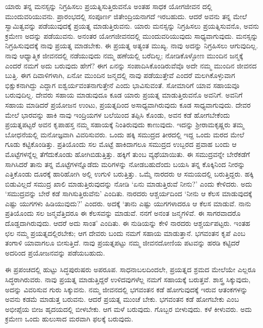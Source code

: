 ಯಾರು ತನ್ನ ಮನಸ್ಸನ್ನು ನಿಗ್ರಹಿಸಲು ಪ್ರಯತ್ನಿಸುತ್ತಿರುವನೊ ಅಂತಹ ಸಾಧಕ ಯೋಗಜೀವನ ದಲ್ಲಿ ಮುಂದುವರಿಯುವನು. ಪ್ರಾರಂಭದಲ್ಲಿ ಸಂಪೂರ್ಣ ಜಿತೇಂದ್ರಿಯನಾಗದೆ ಇರಬಹುದು. ಆದರೆ ಅವನು ತನ್ನ ಮೇಲೆ ಸ್ವಾಮಿತ್ವವನ್ನು ಪಡೆಯುವುದಕ್ಕೆ ಪ್ರಯತ್ನ ಮಾಡುತ್ತಿರುವನು. ಯಾರು ಮನಸ್ಸನ್ನು ನಿಗ್ರಹಿಸಲು ಪ್ರಯತ್ನಿಸುವನೊ, ಅವನು ಕ್ರಮೇಣ ಅದನ್ನು ಪಡೆಯುವನು. ಅನಂತರ ಯೋಗಜೀವನದಲ್ಲಿ ಮುಂದುವರಿಯುವುದು ಸಾಧ್ಯವಾಗುವುದು. ಮನಸ್ಸನ್ನು ನಿಗ್ರಹಿಸುವುದಕ್ಕೆ ನಾವು ಪ್ರಯತ್ನ ಮಾಡಬೇಕು. ಈ ಪ್ರಯತ್ನ ಅತ್ಯಂತ ಮುಖ್ಯ. ನಾವು ಅದನ್ನು ನಿಗ್ರಹಿಸಲು ಆಗುವುದಿಲ್ಲ. ನಾವು ಆಧ್ಯಾತ್ಮಿಕ ಜೀವನದಲ್ಲಿ ನಡೆಯುವುದು ನಮ್ಮ ಹಣೆಯಲ್ಲಿ ಬರೆದಿಲ್ಲ; ನೋಡಿಕೊಳ್ಳೋಣ ಮುಂದಿನ ಜನ್ಮಕ್ಕೆ ಎಂದರೆ ನಮಗೆ ಅದು ಬರುವುದು ಹೇಗೆ? ಈಗ ಏನನ್ನು ಸಂಪಾದಿಸಿಕೊಂಡಿರುವೆವೊ ಅದೇ ನಮ್ಮ ಮುಂದಿನ ಜೀವನದ ಬುತ್ತಿ. ಈಗ ದಿವಾಳಿಗಳಾಗಿ, ಏನೋ ಮುಂದಿನ ಜನ್ಮದಲ್ಲಿ ನಾವು ಪಡೆಯುತ್ತೇವೆ ಎಂದರೆ ಮಲಗಿಕೊಳ್ಳುವಾಗ ಭಿಕ್ಷುಕನಾಗಿದ್ದು ಎದ್ದಾಗ ಐಶ್ವರ್ಯವಂತನಾಗುತ್ತೇನೆ ಎಂದು ಭಾವಿಸುವಂತೆ. ಸೋಮಾರಿಗೆ ಯಾವ ಸಹಾಯವೂ ಬರುವುದಿಲ್ಲ. ದೇವರು ಸಹಾಯ ಮಾಡುವುದೂ ಕೂಡ ಯಾರು ಪ್ರಯತ್ನ ಮಾಡುತ್ತಿರುವನೊ ಅವನಿಗೆ. ಅವನಿಗೆ ಸಹಾಯ ಮಾಡಿದರೆ ಪ್ರಯೋಜನ ಉಂಟು, ಪ್ರಯತ್ನದಿಂದ ಅಸಾಧ್ಯವಾಗಿರುವುದು ಕೂಡ ಸಾಧ್ಯವಾಗುವುದು. ದೇವರ ಮೇಲೆ ಭಾರವನ್ನು ಹಾಕಿ ನಾವು ಇಂದ್ರಿಯಗಳ ಬಲೆಯಿಂದ ತಪ್ಪಿಸಿ ಕೊಂಡು, ಅವನ ಕಡೆ ಹೋಗಬೇಕೆಂದು ಪ್ರಯತ್ನಪಟ್ಟರೆ ಅವನ ಕೃಪಾಹಸ್ತ ನಮ್ಮ ಸಹಾಯಕ್ಕೆ ನಿಂತಿರುವುದು ಕಾಣುವುದು. ಇದನ್ನು ಶ‍್ರೀರಾಮಕೃಷ್ಣರು ತಮ್ಮ ಬೋಧನೆಯಲ್ಲಿ ಮನೋಜ್ಞವಾಗಿ ವಿವರಿಸುವರು. ಒಂದು ಹಕ್ಕಿ ಸಮುದ್ರದ ತೀರದಲ್ಲಿ ಇದ್ದ ಒಂದು ಮರದ ಮೇಲೆ ಗೂಡು ಕಟ್ಟಿಕೊಂಡಿತ್ತು. ಪ್ರತಿಯೊಂದು ಸಲ ಮೊಟ್ಟೆ ಹಾಕಿದಾಗಲೂ ಸಮುದ್ರದ ಉಬ್ಬರದ ಪ್ರವಾಹ ಬಂದು ಆ ಮೊಟ್ಟೆಗಳನ್ನೆಲ್ಲ ತೆಗೆದುಕೊಂಡು ಹೋಗಿಬಿಡುತ್ತಿತ್ತು. ಹಕ್ಕಿಗೆ ತುಂಬ ವ್ಯಥೆಯಾಯಿತು. ಈ ಸಮುದ್ರವನ್ನೇ ಬೇರೆಕಡೆಗೆ ಸಾಗಿಸಿದರೆ ತಾನು ತನ್ನ ಮೊಟ್ಟೆಗಳನ್ನೊಡೆದು ಮರಿಗಳನ್ನು ನೋಡಬಹುದೆಂದು ಬಯಸಿ ತನ್ನ ಕೊಕ್ಕಿನಿಂದ ನೀರನ್ನು ಎತ್ತಿಕೊಂಡು ದೂರಕ್ಕೆ ಹಾರಿಹೋಗಿ ಅಲ್ಲಿ ಉಗುಳಿ ಬರುತ್ತಿತ್ತು. ಒಮ್ಮೆ ನಾರದರು ಆ ಸಮಯದಲ್ಲಿ ಬರುತ್ತಿದ್ದರು. ಹಕ್ಕಿ ಬಿಡುವಿಲ್ಲದೆ ಸಮುದ್ರ ಖಾಲಿ ಮಾಡುತ್ತಿರುವುದನ್ನು ನೋಡಿ ‘ಏನು ಮಾಡುತ್ತಿರುವೆ ನೀನು?’ ಎಂದು ಕೇಳಿದರು. ಅದು ‘ಸಮುದ್ರವನ್ನು ಬೇರೆ ಕಡೆ ಸಾಗಿಸುತ್ತಿರುವೆನು’ ಎಂದಿತು. ನಾರದರು ಆಶ್ಚರ್ಯದಿಂದ ‘ನೀನು ಆ ಕೆಲಸ ಮಾಡುವುದಕ್ಕೆ ಎಷ್ಟು ಯುಗಗಳು ಹಿಡಿಯುವುದು?’ ಎಂದರು. ಅದಕ್ಕೆ ‘ತಾನು ಎಷ್ಟು ಯುಗಗಳಾದರೂ ಆ ಕೆಲಸ ಮಾಡುವೆ. ನಾನು ಪ್ರತಿಯೊಂದು ಸಲ ಜನ್ಮವೆತ್ತಿದರೂ ಈ ಕೆಲಸವನ್ನು ಮಾಡುವೆ. ನನಗೆ ಅನಂತ ಜನ್ಮಗಳಿವೆ. ಈ ಸಾಗರವಾದರೊ ದೊಡ್ಡದಾಗಿರುವುದು. ಆದರೆ ಅದು ಸಾಂತ’ ಎಂದಿತು. ಈ ನುಡಿಯನ್ನು ಕೇಳಿ ನಾರದರು ಆಶ್ಚರ್ಯಪಟ್ಟರು. ಇಂತಹ ಛಲ ನಮ್ಮ ಪ್ರಯತ್ನದಲ್ಲಿರಬೇಕು; ಆಗ ದೇವರು ಬಂದು ನಮಗೆ ಸಹಾಯ ಮಾಡುತ್ತಾನೆ. ಭಗವಂತನ ಕೃಪೆ ಎಂಬ ತಂಗಾಳಿ ಯಾವಾಗಲೂ ಬೀಸುತ್ತಿದೆ. ನಾವು ಪ್ರಯತ್ನಪಟ್ಟು ನಮ್ಮ ಜೀವನದೋಣಿಯ ಪಟವನ್ನು ಹರಡಿ ಕಟ್ಟಿದರೆ ಅದರಿಂದ ಪ್ರಯೋಜನವನ್ನು ಪಡೆಯಬಹುದು.

ಈ ಪ್ರಪಂಚದಲ್ಲಿ ಹುಟ್ಟು ಸಿದ್ಧಪುರುಷರು ಅಪರೂಪ. ಸಾಧನಾಬಲದಿಂದಲೇ, ಪ್ರಯತ್ನದ ಶ್ರಮದ ಮೇಲೆಯೇ ಎಲ್ಲರೂ ಸಿದ್ಧರಾಗಿರುವರು. ನಾವು ಪ್ರಯತ್ನ ಮಾಡುತ್ತಿದ್ದರೆ ಉಳಿದವುಗಳೆಲ್ಲ ನಮಗೆ ಸಹಾಯಕ್ಕೆ ಬರುತ್ತವೆ. ಶಾಸ್ತ್ರ ಸಿಕ್ಕುವುದು, ಅದನ್ನು ವಿವರಿಸುವ ಗುರು ಸಿಕ್ಕುವನು. ನಮ್ಮ ಜೀವನದಲ್ಲಿ ಭಗವಂತನ ಕಡೆ ಹೋಗುವುದಕ್ಕೆ ಇರುವ ಆತಂಕಗಳನ್ನು ಅವನು ಕಡಮೆ ಮಾಡುತ್ತ ಬರುವನು. ಆದರೆ ಪ್ರಯತ್ನ ಮುಂಚೆ ಬೇಕು. ಭಗವಂತನ ಕಡೆ ಹೋಗಬೇಕು ಎಂಬ ಅಭೀಪ್ಸೆಯ ಬೀಜ ಹೃದಯದಲ್ಲಿ ಬೀಳಬೇಕು. ಆಗ ಮಳೆ ಬರುವುದು. ಗೊಬ್ಬರ ಬೀಳುವುದು. ಕಳೆ ಕೀಳುವರು. ಅದು ಕ್ರಮೇಣ ಒಂದು ಹುಲುಸಾದ ಮರವಾಗಿ ಫಲಕ್ಕೆ ಬರುವುದು.

